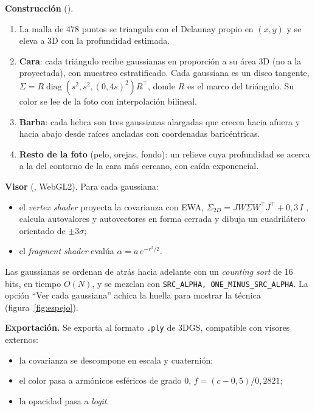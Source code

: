 \textbf{Construcción} ().
\begin{enumerate}
  \item La malla de 478 puntos se triangula con el Delaunay propio en $(x,y)$ y se eleva a 3D con la profundidad estimada.
  \item \textbf{Cara}: cada triángulo recibe gaussianas en proporción a su área 3D (no a la proyectada), con muestreo estratificado. Cada gaussiana es un disco tangente, $\Sigma=R\operatorname{diag}(s^2,s^2,(0{,}4s)^2)R^\top$, donde $R$ es el marco del triángulo. Su color se lee de la foto con interpolación bilineal.
  \item \textbf{Barba}: cada hebra son tres gaussianas alargadas que crecen hacia afuera y hacia abajo desde raíces ancladas con coordenadas baricéntricas.
  \item \textbf{Resto de la foto} (pelo, orejas, fondo): un relieve cuya profundidad se acerca a la del contorno de la cara más cercano, con caída exponencial.
\end{enumerate}

\textbf{Visor} (, WebGL2). Para cada gaussiana:
\begin{itemize}
  \item el \emph{vertex shader} proyecta la covarianza con EWA, $\Sigma_{2D}=JW\Sigma W^\top J^\top+0{,}3\,I$ \cite{zwicker2001}, calcula autovalores y autovectores en forma cerrada y dibuja un cuadrilátero orientado de $\pm3\sigma$;
  \item el \emph{fragment shader} evalúa $\alpha=a\,e^{-r^2/2}$.
\end{itemize}
Las gaussianas se ordenan de atrás hacia adelante con un \emph{counting sort} de 16 bits, en tiempo $O(N)$, y se mezclan con \texttt{SRC\_ALPHA, ONE\_MINUS\_SRC\_ALPHA}. La opción ``Ver cada gaussiana'' achica la huella para mostrar la técnica (figura~\ref{fig:espejo}).

\textbf{Exportación.} Se exporta al formato \texttt{.ply} de 3DGS, compatible con visores externos:
\begin{itemize}
  \item la covarianza se descompone en escala y cuaternión;
  \item el color pasa a armónicos esféricos de grado 0, $f=(c-0{,}5)/0{,}2821$;
  \item la opacidad pasa a \emph{logit}.
\end{itemize}

